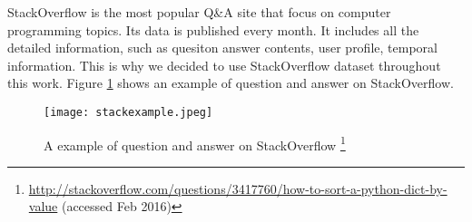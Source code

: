 StackOverflow is the most popular Q\&A site that focus on computer programming topics. Its data is published every month. It includes all the detailed information, such as quesiton answer contents, user profile, temporal information. This is why we decided to use StackOverflow dataset throughout this work. Figure \ref{fig:stackexample} shows an example of question and answer on StackOverflow.  
\begin{figure}%
\centering
\texttt{[image: stackexample.jpeg]}  
\caption{A example of question and answer on StackOverflow \footnote{\url{http://stackoverflow.com/questions/3417760/how-to-sort-a-python-dict-by-value} (accessed Feb 2016)}}
\label{fig:stackexample} 
\end{figure}

